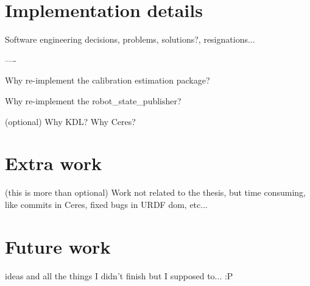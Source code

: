 \chapter{Implementation details}
\label{cha:implementation}

Software engineering decisions, problems, solutions?, resignations...


----

Why re-implement the calibration estimation package?

Why re-implement the robot\_state\_publisher?

(optional)
Why KDL?
Why Ceres?




\chapter{Extra work}
\label{cha:extra}

(this is more than optional)
Work not related to the thesis, but time consuming, like commits in Ceres, fixed bugs in URDF dom, etc...



\chapter{Future work}
\label{cha:future}

ideas and all the things I didn't finish but I supposed to... :P
